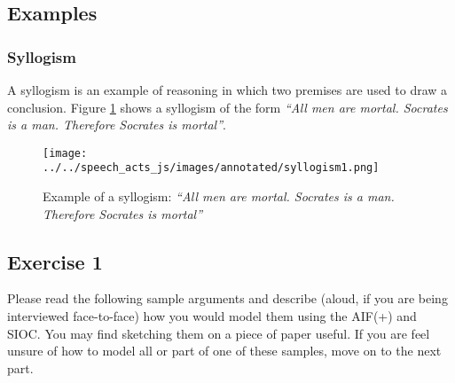 \subsection{Examples}
\subsubsection{Syllogism}
A syllogism is an example of reasoning in which two premises are used to draw a conclusion. Figure \ref{figure:app_syllogism1} shows a syllogism of the form \textit{``All men are mortal. Socrates is a man. Therefore Socrates is mortal''}.

\begin{figure}[H]
\centering
\texttt{[image: ../../speech\_acts\_js/images/annotated/syllogism1.png]}
\caption{Example of a syllogism: \textit{``All men are mortal. Socrates is a man. Therefore Socrates is mortal''}}
\label{figure:app_syllogism1}
\end{figure}

\subsection{Exercise 1}
Please read the following sample arguments and describe (aloud, if you are being interviewed face-to-face) how you would model them using the AIF(+) and SIOC. You may find sketching them on a piece of paper useful. If you are feel unsure of how to model all or part of one of these samples, move on to the next part.

